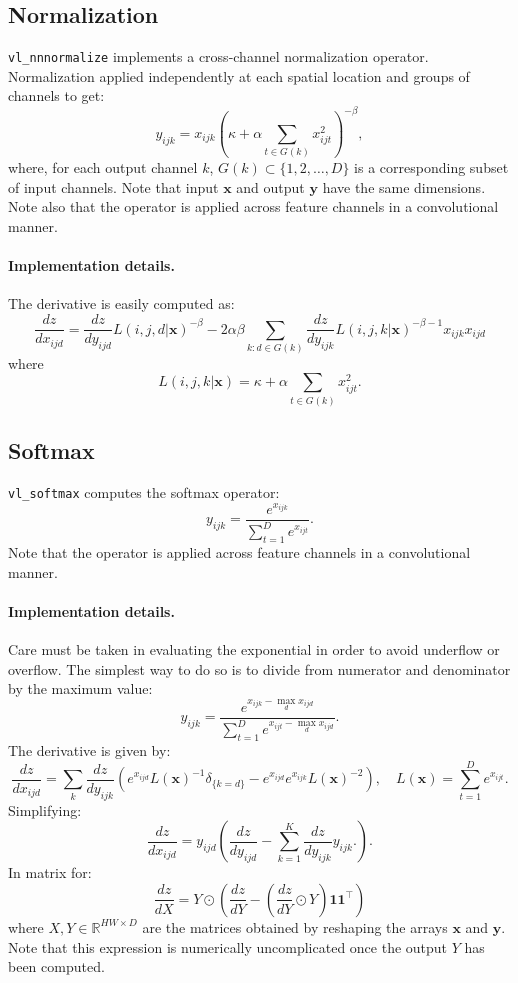 \documentclass[12pt]{article}
\newcommand{\real}{\mathbb{R}}
\newcommand{\bx}{\mathbf{x}}
\newcommand{\by}{\mathbf{y}}
\newcommand{\bone}{\mathbf{1}}
\begin{document}
\subsection{Normalization}\label{s:normalization}

\verb!vl_nnnormalize! implements a cross-channel normalization operator. Normalization applied independently at each spatial location and groups of channels to get:
\[
 y_{ijk} = x_{ijk} \left( \kappa + \alpha \sum_{t\in G(k)} x_{ijt}^2 \right)^{-\beta},
\]
where, for each output channel $k$, $G(k) \subset \{1, 2, \dots, D\}$ is a corresponding subset of input channels. Note that input $\bx$ and output $\by$ have the same dimensions. Note also that the operator is applied across feature channels in a convolutional manner.


\paragraph{Implementation details.} The derivative is easily computed as:
\[
\frac{dz}{d x_{ijd}}
=
\frac{dz}{d y_{ijd}}
L(i,j,d|\bx)^{-\beta}
-2\alpha\beta
\sum_{k:d\in G(k)}
\frac{dz}{d y_{ijk}}
L(i,j,k|\bx)^{-\beta-1} x_{ijk} x_{ijd}
\]
where
\[
 L(i,j,k|\bx) = \kappa + \alpha \sum_{t\in G(k)} x_{ijt}^2.
\]

\subsection{Softmax}\label{s:softmax}

\verb!vl_softmax! computes the softmax operator:
\[
 y_{ijk} = \frac{e^{x_{ijk}}}{\sum_{t=1}^D e^{x_{ijt}}}.
\]
Note that the operator is applied across feature channels in a convolutional manner.

\paragraph{Implementation details.} Care must be taken in evaluating the exponential in order to avoid underflow or overflow. The simplest way to do so is to divide from numerator and denominator by the maximum value:
\[
 y_{ijk} = \frac{e^{x_{ijk} - \max_d x_{ijd}}}{\sum_{t=1}^D e^{x_{ijt}- \max_d x_{ijd}}}.
\]
The derivative is given by:
\[
\frac{dz}{d x_{ijd}}
=
\sum_{k}
\frac{dz}{d y_{ijk}}
\left(
e^{x_{ijd}} L(\bx)^{-1} \delta_{\{k=d\}}
-
e^{x_{ijd}}
e^{x_{ijk}} L(\bx)^{-2}
\right),
\quad
L(\bx) = \sum_{t=1}^D e^{x_{ijt}}.
\]
Simplifying:
\[
\frac{dz}{d x_{ijd}}
=
y_{ijd} 
\left(
\frac{dz}{d y_{ijd}}
-
\sum_{k=1}^K
\frac{dz}{d y_{ijk}} y_{ijk}.
\right).
\]
In matrix for:
\[
  \frac{dz}{dX} = Y \odot \left(\frac{dz}{dY} 
  - \left(\frac{dz}{dY} \odot Y\right) \bone\bone^\top\right)
\]
where $X,Y\in\real^{HW\times D}$ are the matrices obtained by reshaping the arrays
$\bx$ and $\by$. Note that this expression is numerically uncomplicated once the output $Y$ has been computed.
\end{document}
